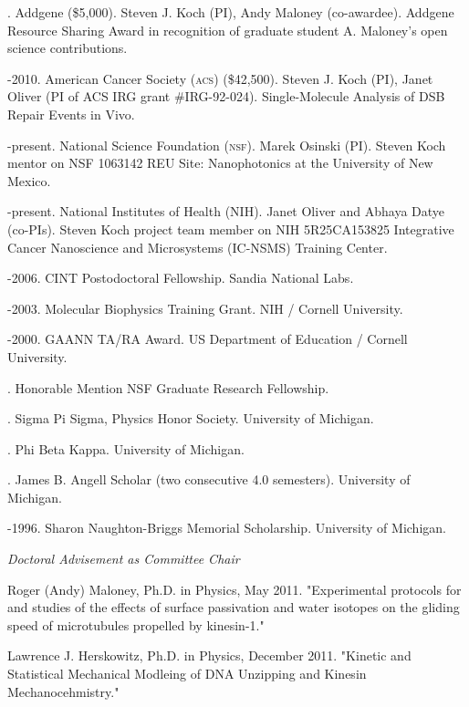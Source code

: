 \documentclass[11pt]{article}
\begin{document}
. Addgene (\$5,000). Steven J. Koch (PI), Andy Maloney (co-awardee). Addgene Resource Sharing Award in recognition of graduate student A. Maloney's open science contributions.

-2010. American Cancer Society (\textsc{acs}) (\$42,500).  Steven J. Koch (PI), Janet Oliver (PI of ACS IRG grant \#IRG-92-024). Single-Molecule Analysis of DSB Repair Events in Vivo.

-present. National Science Foundation (\textsc{nsf}). Marek Osinski (PI). Steven Koch mentor on NSF 1063142 REU Site: Nanophotonics at the University of New Mexico.

-present. National Institutes of Health (\textsc{NIH}). Janet Oliver and Abhaya Datye (co-PIs). Steven Koch project team member on NIH 5R25CA153825 Integrative Cancer Nanoscience and Microsystems (IC-NSMS) Training Center.

-2006. CINT Postodoctoral Fellowship.  Sandia National Labs.

-2003. Molecular Biophysics Training Grant. NIH / Cornell University.

-2000. GAANN TA/RA Award.  US Department of Education / Cornell University.

. Honorable Mention NSF Graduate Research Fellowship.

. Sigma Pi Sigma, Physics Honor Society. University of Michigan.

. Phi Beta Kappa. University of Michigan.

. James B. Angell Scholar (two consecutive 4.0 semesters). University of Michigan.

-1996. Sharon Naughton-Briggs Memorial Scholarship.  University of Michigan.

\bigskip 

\newpage

\medskip
{}

\noindent\emph{Doctoral Advisement as Committee Chair \vspace{0.01in}}

\ind Roger (Andy) Maloney, Ph.D. in Physics, May 2011. "Experimental protocols for and studies of the effects of surface passivation and water isotopes on the gliding speed of microtubules propelled by kinesin-1."

\ind Lawrence J. Herskowitz, Ph.D. in Physics, December 2011. "Kinetic and Statistical Mechanical Modleing of DNA Unzipping and Kinesin Mechanocehmistry."
\end{document}
